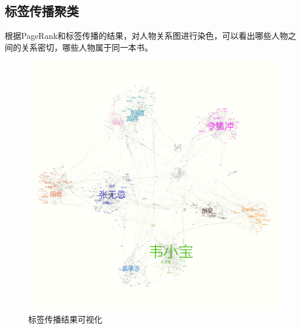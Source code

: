 \newpage
\subsection{标签传播聚类}
根据PageRank和标签传播的结果，对人物关系图进行染色，可以看出哪些人物之间的关系密切，哪些人物属于同一本书。
\begin{figure}[ht]
	\centering
	\includegraphics[scale=0.45]{figures/label_prop.png}
	\caption{标签传播结果可视化}
\end{figure}